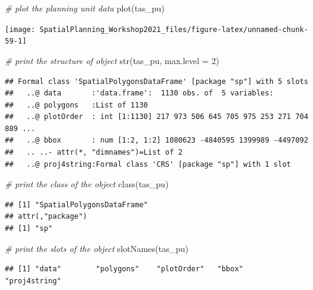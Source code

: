 \documentclass[
  12pt,
]{book}
\newenvironment{Shaded}{\begin{snugshade}}{\end{snugshade}}
\newcommand{\AttributeTok}[1]{\textcolor[rgb]{0.77,0.63,0.00}{#1}}
\newcommand{\CommentTok}[1]{\textcolor[rgb]{0.56,0.35,0.01}{\textit{#1}}}
\newcommand{\DecValTok}[1]{\textcolor[rgb]{0.00,0.00,0.81}{#1}}
\newcommand{\FunctionTok}[1]{\textcolor[rgb]{0.00,0.00,0.00}{#1}}
\newcommand{\NormalTok}[1]{#1}
\begin{document}
\begin{Shaded}
\begin{Highlighting}[]
\CommentTok{\# plot the planning unit data}
\FunctionTok{plot}\NormalTok{(tas\_pu)}
\end{Highlighting}
\end{Shaded}

\begin{center}\texttt{[image: SpatialPlanning\_Workshop2021\_files/figure-latex/unnamed-chunk-59-1]} \end{center}

\begin{Shaded}
\begin{Highlighting}[]
\CommentTok{\# print the structure of object}
\FunctionTok{str}\NormalTok{(tas\_pu, }\AttributeTok{max.level =} \DecValTok{2}\NormalTok{)}
\end{Highlighting}
\end{Shaded}

\begin{verbatim}
## Formal class 'SpatialPolygonsDataFrame' [package "sp"] with 5 slots
##   ..@ data       :'data.frame':  1130 obs. of  5 variables:
##   ..@ polygons   :List of 1130
##   ..@ plotOrder  : int [1:1130] 217 973 506 645 705 975 253 271 704 889 ...
##   ..@ bbox       : num [1:2, 1:2] 1080623 -4840595 1399989 -4497092
##   .. ..- attr(*, "dimnames")=List of 2
##   ..@ proj4string:Formal class 'CRS' [package "sp"] with 1 slot
\end{verbatim}

\begin{Shaded}
\begin{Highlighting}[]
\CommentTok{\# print the class of the object}
\FunctionTok{class}\NormalTok{(tas\_pu)}
\end{Highlighting}
\end{Shaded}

\begin{verbatim}
## [1] "SpatialPolygonsDataFrame"
## attr(,"package")
## [1] "sp"
\end{verbatim}

\begin{Shaded}
\begin{Highlighting}[]
\CommentTok{\# print the slots of the object}
\FunctionTok{slotNames}\NormalTok{(tas\_pu)}
\end{Highlighting}
\end{Shaded}

\begin{verbatim}
## [1] "data"        "polygons"    "plotOrder"   "bbox"        "proj4string"
\end{verbatim}
\end{document}
